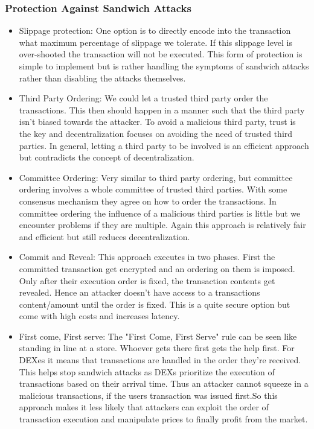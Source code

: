 \documentclass{article}
\begin{document}
\subsubsection{Protection Against Sandwich Attacks}
\begin{itemize}
\item {Slippage protection}: One option is to directly encode into the transaction what maximum percentage of slippage we tolerate. If this slippage level is over-shooted the transaction will not be executed. This form of protection is simple to implement but is rather handling the symptoms of sandwich attacks rather than disabling  the attacks themselves.
\item {Third Party Ordering}: We could let a trusted third party order the transactions. This then should happen in a manner such that the third party isn't biased towards the attacker. To avoid a malicious third party, trust is the key and decentralization focuses on avoiding the need of trusted third parties. In general, letting a third party to be involved is an efficient approach but contradicts the concept of decentralization.
\item {Committee Ordering}: Very similar to third party ordering, but committee ordering involves a whole committee of trusted third parties. With some consensus mechanism they agree on how to order the transactions. In committee ordering the influence of a malicious third parties is little but we encounter problems if they are multiple. Again this approach is relatively fair and efficient but still reduces decentralization.
\item {Commit and Reveal}: This approach executes in two phases. First the committed transaction get encrypted and an ordering on them is imposed. Only after their execution order is fixed, the transaction contents get revealed. Hence an attacker doesn't have access to a transactions content/amount until the order is fixed. This is a quite secure option but come with high costs and increases latency.
\item {First come, First serve}:
The "First Come, First Serve" rule can be seen like standing in line at a store. Whoever gets there first gets the help first. For DEXes it means that transactions are handled in the order they're received. This helps stop sandwich attacks as DEXs prioritize the execution of transactions based on their arrival time. Thus an attacker cannot squeeze in a malicious transactions, if the users transaction was issued first.So this approach makes it less likely that attackers can exploit the order of transaction execution and manipulate prices to finally profit from the market.
\end{itemize}
\end{document}
